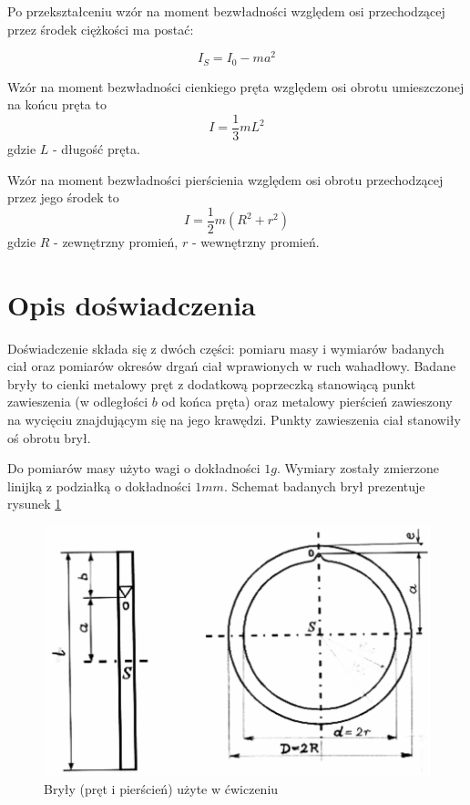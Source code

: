 \documentclass[a4paper,10pt,twoside]{article}
\begin{document}
Po przekształceniu wzór na moment bezwładności względem osi przechodzącej przez środek ciężkości ma postać:

$$ I_S = I_0 - ma^2 $$


Wzór na moment bezwładności cienkiego pręta względem osi obrotu umieszczonej na końcu pręta to $$ I = \frac{1}{3}mL^2 $$ gdzie $L$ - długość pręta.

Wzór na moment bezwładności pierścienia względem osi obrotu przechodzącej przez jego środek to $$ I = \frac{1}{2}m(R^2 + r^2) $$ gdzie $R$ - zewnętrzny promień, $r$ - wewnętrzny promień.

\section{Opis doświadczenia}

Doświadczenie składa się z dwóch części: pomiaru masy i wymiarów badanych ciał oraz pomiarów okresów drgań ciał wprawionych w ruch wahadłowy. Badane bryły to cienki metalowy pręt z dodatkową poprzeczką stanowiącą punkt zawieszenia (w odległości $b$ od końca pręta) oraz metalowy pierścień zawieszony na wycięciu znajdującym się na jego krawędzi. Punkty zawieszenia ciał stanowiły oś obrotu brył.

Do pomiarów masy użyto wagi o dokładności $1 \unit{g}$. Wymiary zostały zmierzone linijką z podziałką o dokładności $1 \unit{mm}$. Schemat badanych brył prezentuje rysunek \ref{fig:bryly}

\begin{figure}[!htp]
\centerline{\includegraphics[scale=0.3]{bryly.png}}
\caption{Bryły (pręt i pierścień) użyte w ćwiczeniu}
\label{fig:bryly}
\end{figure}
\end{document}
